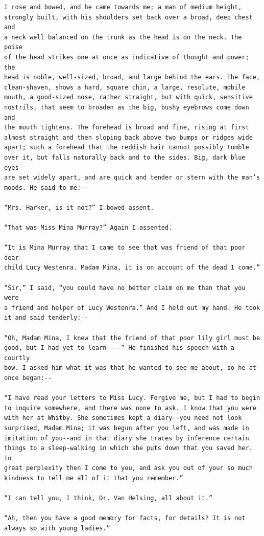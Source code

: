 \documentclass{article}
\begin{document}
\begin{verbatim}
I rose and bowed, and he came towards me; a man of medium height,
strongly built, with his shoulders set back over a broad, deep chest and
a neck well balanced on the trunk as the head is on the neck. The poise
of the head strikes one at once as indicative of thought and power; the
head is noble, well-sized, broad, and large behind the ears. The face,
clean-shaven, shows a hard, square chin, a large, resolute, mobile
mouth, a good-sized nose, rather straight, but with quick, sensitive
nostrils, that seem to broaden as the big, bushy eyebrows come down and
the mouth tightens. The forehead is broad and fine, rising at first
almost straight and then sloping back above two bumps or ridges wide
apart; such a forehead that the reddish hair cannot possibly tumble
over it, but falls naturally back and to the sides. Big, dark blue eyes
are set widely apart, and are quick and tender or stern with the man’s
moods. He said to me:--

“Mrs. Harker, is it not?” I bowed assent.

“That was Miss Mina Murray?” Again I assented.

“It is Mina Murray that I came to see that was friend of that poor dear
child Lucy Westenra. Madam Mina, it is on account of the dead I come.”

“Sir,” I said, “you could have no better claim on me than that you were
a friend and helper of Lucy Westenra.” And I held out my hand. He took
it and said tenderly:--

“Oh, Madam Mina, I knew that the friend of that poor lily girl must be
good, but I had yet to learn----” He finished his speech with a courtly
bow. I asked him what it was that he wanted to see me about, so he at
once began:--

“I have read your letters to Miss Lucy. Forgive me, but I had to begin
to inquire somewhere, and there was none to ask. I know that you were
with her at Whitby. She sometimes kept a diary--you need not look
surprised, Madam Mina; it was begun after you left, and was made in
imitation of you--and in that diary she traces by inference certain
things to a sleep-walking in which she puts down that you saved her. In
great perplexity then I come to you, and ask you out of your so much
kindness to tell me all of it that you remember.”

“I can tell you, I think, Dr. Van Helsing, all about it.”

“Ah, then you have a good memory for facts, for details? It is not
always so with young ladies.”


\end{verbatim}
\end{document}
